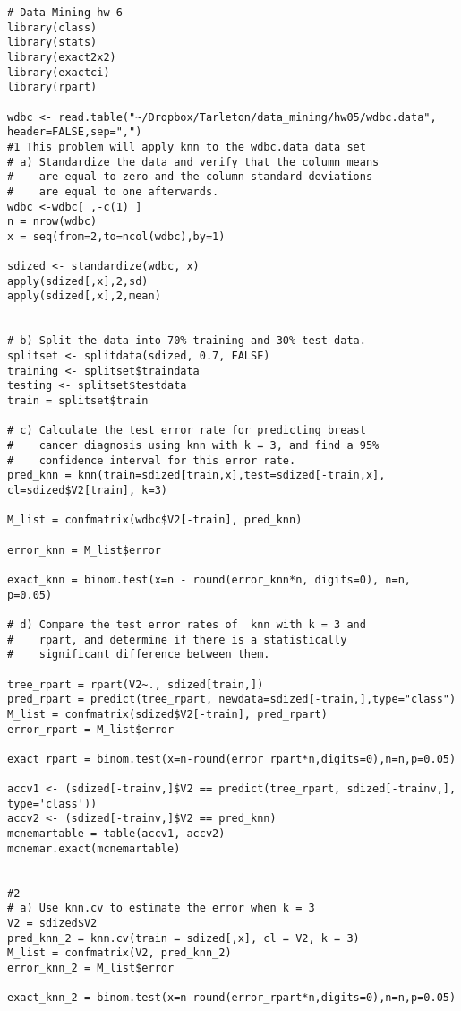 \documentclass[11pt]{article}
\begin{document}
\begin{Verbatim}
# Data Mining hw 6
library(class)
library(stats)
library(exact2x2)
library(exactci)
library(rpart)

wdbc <- read.table("~/Dropbox/Tarleton/data_mining/hw05/wdbc.data",
header=FALSE,sep=",")
#1 This problem will apply knn to the wdbc.data data set
# a) Standardize the data and verify that the column means 
#    are equal to zero and the column standard deviations 
#    are equal to one afterwards.
wdbc <-wdbc[ ,-c(1) ]
n = nrow(wdbc)
x = seq(from=2,to=ncol(wdbc),by=1)

sdized <- standardize(wdbc, x)
apply(sdized[,x],2,sd)
apply(sdized[,x],2,mean)


# b) Split the data into 70% training and 30% test data.
splitset <- splitdata(sdized, 0.7, FALSE)
training <- splitset$traindata
testing <- splitset$testdata
train = splitset$train

# c) Calculate the test error rate for predicting breast 
#    cancer diagnosis using knn with k = 3, and find a 95% 
#    confidence interval for this error rate.
pred_knn = knn(train=sdized[train,x],test=sdized[-train,x],
cl=sdized$V2[train], k=3)

M_list = confmatrix(wdbc$V2[-train], pred_knn)

error_knn = M_list$error

exact_knn = binom.test(x=n - round(error_knn*n, digits=0), n=n, p=0.05)

# d) Compare the test error rates of  knn with k = 3 and 
#    rpart, and determine if there is a statistically 
#    significant difference between them. 

tree_rpart = rpart(V2~., sdized[train,])
pred_rpart = predict(tree_rpart, newdata=sdized[-train,],type="class")
M_list = confmatrix(sdized$V2[-train], pred_rpart)
error_rpart = M_list$error

exact_rpart = binom.test(x=n-round(error_rpart*n,digits=0),n=n,p=0.05)

accv1 <- (sdized[-trainv,]$V2 == predict(tree_rpart, sdized[-trainv,], type='class'))
accv2 <- (sdized[-trainv,]$V2 == pred_knn)
mcnemartable = table(accv1, accv2)
mcnemar.exact(mcnemartable)


#2
# a) Use knn.cv to estimate the error when k = 3
V2 = sdized$V2
pred_knn_2 = knn.cv(train = sdized[,x], cl = V2, k = 3)
M_list = confmatrix(V2, pred_knn_2)
error_knn_2 = M_list$error

exact_knn_2 = binom.test(x=n-round(error_rpart*n,digits=0),n=n,p=0.05)


\end{Verbatim}
\end{document}
